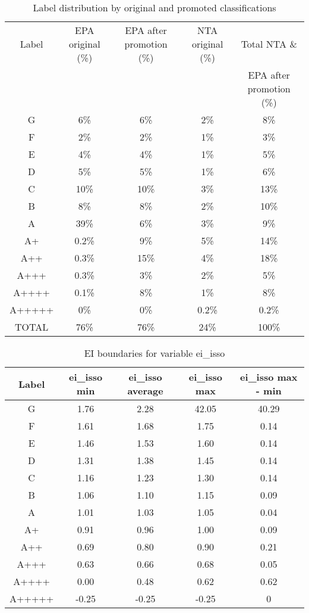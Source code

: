 \documentclass{article}
\begin{document}
\begin{table}[h!]
   \centering
   \begin{tabular}{|c|c|c|c|c|}
       \hline
       Label & EPA original (\%) & EPA after promotion (\%) & NTA original (\%) & Total NTA \& \\ 
       & & & & EPA after promotion (\%) \\
       \hline
       G & 6\% & 6\% & 2\% & 8\% \\
       F & 2\% & 2\% & 1\% & 3\% \\
       E & 4\% & 4\% & 1\% & 5\% \\
       D & 5\% & 5\% & 1\% & 6\% \\
       C & 10\% & 10\% & 3\% & 13\% \\
       B & 8\% & 8\% & 2\% & 10\% \\
       A & 39\% & 6\% & 3\% & 9\% \\
       A+ & 0.2\% & 9\% & 5\% & 14\% \\
       A++ & 0.3\% & 15\% & 4\% & 18\% \\
       A+++ & 0.3\% & 3\% & 2\% & 5\% \\
       A++++ & 0.1\% & 8\% & 1\% & 8\% \\
       A+++++ & 0\% & 0\% & 0.2\% & 0.2\% \\
       \hline
       TOTAL & 76\% & 76\% & 24\% & 100\% \\
   \end{tabular}
   \caption{Label distribution by original and promoted classifications}
\end{table}

\begin{table}[h!]
   \centering
   \begin{tabular}{|c|c|c|c|c|}
       \hline
       Label & ei\_isso min & ei\_isso average & ei\_isso max & ei\_isso max - min \\
       \hline
       G & 1.76 & 2.28 & 42.05 & 40.29 \\
       F & 1.61 & 1.68 & 1.75 & 0.14 \\
       E & 1.46 & 1.53 & 1.60 & 0.14 \\
       D & 1.31 & 1.38 & 1.45 & 0.14 \\
       C & 1.16 & 1.23 & 1.30 & 0.14 \\
       B & 1.06 & 1.10 & 1.15 & 0.09 \\
       A & 1.01 & 1.03 & 1.05 & 0.04 \\
       A+ & 0.91 & 0.96 & 1.00 & 0.09 \\
       A++ & 0.69 & 0.80 & 0.90 & 0.21 \\
       A+++ & 0.63 & 0.66 & 0.68 & 0.05 \\
       A++++ & 0.00 & 0.48 & 0.62 & 0.62 \\
       A+++++ & -0.25 & -0.25 & -0.25 & 0 \\
       \hline
   \end{tabular}
   \caption{EI boundaries for variable ei\_isso}
\end{table}
\end{document}
